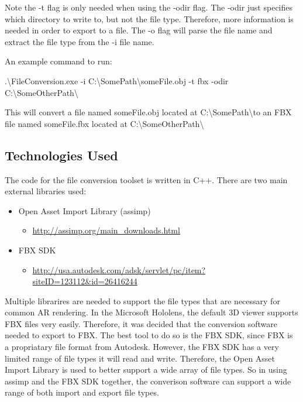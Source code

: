     Note the -t flag is only needed when using the -odir flag.  The -odir just specifies which directory to write to, but not the file type.
    Therefore, more information is needed in order to export to a file.  The -o flag will parse the file name and extract the file type from the -i file name.

    An example command to run:

    \begin{center}
        .\textbackslash FileConversion.exe -i C:\textbackslash SomePath\textbackslash someFile.obj -t fbx -odir C:\textbackslash SomeOtherPath\textbackslash
    \end{center}

    This will convert a file named someFile.obj located at C:\textbackslash SomePath\textbackslash  to an FBX file named someFile.fbx located at 
    C:\textbackslash SomeOtherPath\textbackslash

    \subsection{Technologies Used}

    The code for the file conversion toolset is written in C++.  There are two main external libraries used:
    \begin{itemize}
        \item Open Asset Import Library (assimp)
        \begin{itemize}
            \item \url{http://assimp.org/main_downloads.html}
        \end{itemize}

        \item FBX SDK
        \begin{itemize}
            \item \url{http://usa.autodesk.com/adsk/servlet/pc/item?siteID=123112&id=26416244}
        \end{itemize}
    \end{itemize}

    Multiple librarires are needed to support the file types that are necessary for common AR rendering.  In the Microsoft Hololens, the default
    3D viewer supports FBX files very easily.  Therefore, it was decided that the conversion software needed to export to FBX.  The best tool to do 
    so is the FBX SDK, since FBX is a propriatary file format from Autodesk.  However, the FBX SDK has a very limited range of file types it will read and write.
    Therefore, the Open Asset Import Library is used to better support a wide array of file types.  So in using assimp and the FBX SDK together,
    the converison software can support a wide range of both import and export file types.


